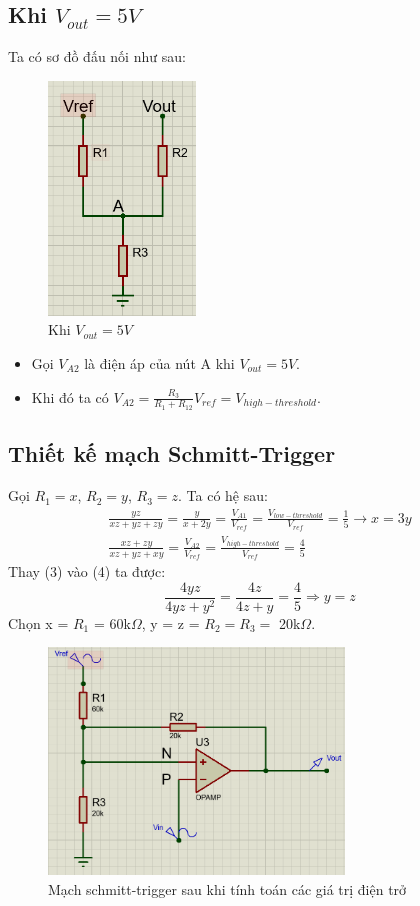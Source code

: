 \subsection{Khi $V_{out} = 5V$}
Ta có sơ đồ đấu nối như sau:
\begin{figure}[H]
    \centering
    \includegraphics[width=0.35\textwidth]{pictures/Vo_5.png}
    \caption{Khi $V_{out} = 5V$}
\end{figure}
\begin{itemize}
    \item Gọi $V_{A2}$ là điện áp của nút A khi $V_{out} = 5V$.
    \item Khi đó ta có $V_{A2} = \frac{R_3}{R_1+R_{12}}V_{ref} = V_{high-threshold}$.
\end{itemize}
    \subsection{Thiết kế mạch Schmitt-Trigger}
Gọi $R_1 = x$, $R_2 = y$, $R_3 = z$.
Ta có hệ sau:
\begin{align}
\frac{yz}{xz+yz+zy} = \frac{y}{x+2y} = \frac{V_{A1}}{V_{ref}} = \frac{V_{low-threshold}}{V_{ref}} = \frac{1}{5} 
    \rightarrow x = 3y \\
    \frac{xz+zy}{xz+yz+xy} = \frac{V_{A2}}{V_{ref}} = \frac{V_{high-threshold}}{V_{ref}} = \frac{4}{5}
\end{align}
Thay (3) vào (4) ta được:
\[
\frac{4yz}{4yz + y^2} = \frac{4z}{4z+y} = \frac{4}{5} \Rightarrow y = z
\]
Chọn x = $R_1$ = 60k$\Omega$, y = z = $R_2 = R_3 =$ 20k$\Omega$.\\
\begin{figure}[H]
    \centering
    \includegraphics[width=0.7\textwidth]{pictures/smith2}
    \caption{Mạch schmitt-trigger sau khi tính toán các giá trị điện trở}
\end{figure}
